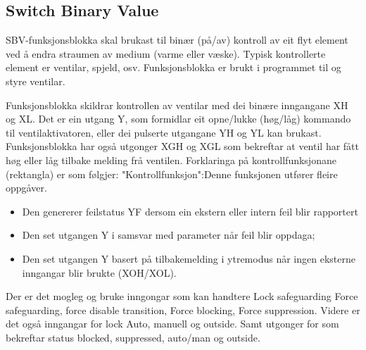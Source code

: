\newpage

\subsection{Switch Binary Value}

\gls{SBV}-funksjonsblokka skal brukast til binær (på/av) kontroll av eit flyt element ved å endra straumen av medium (varme eller væske). 
Typisk kontrollerte element er ventilar, spjeld, osv.
Funksjonsblokka er brukt i programmet til og styre ventilar.

Funksjonsblokka skildrar kontrollen av ventilar med dei binære inngangane XH og XL.
Det er ein utgang Y, som formidlar eit opne/lukke (høg/låg) kommando til ventilaktivatoren,
eller dei pulserte utgangane YH og YL kan brukast. Funksjonsblokka har også utgonger XGH og XGL som bekreftar at ventil har fått høg eller låg tilbake melding frå ventilen.
Forklaringa på kontrollfunksjonane (rektangla) er som følgjer: "Kontrollfunksjon":Denne funksjonen utfører fleire oppgåver.
\begin{itemize}
    \item Den genererer feilstatus YF dersom ein ekstern eller intern feil blir rapportert
    \item Den set utgangen Y i samsvar med parameter når feil blir oppdaga;
    \item Den set utgangen Y basert på tilbakemelding i ytremodus når ingen eksterne inngangar blir brukte (XOH/XOL).
\end{itemize}

Der er det mogleg og bruke inngongar som kan handtere Lock safeguarding Force safeguarding, force disable transition, Force blocking, Force suppression. Videre er det også inngangar for lock Auto, manuell og outside.
Samt utgonger for som bekreftar status blocked, suppressed, auto/man og outside.

